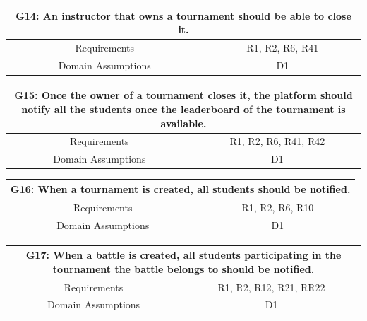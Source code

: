 \documentclass{article}
\begin{document}
\begin{table}[htbp]
    \centering
    \begin{tabular*}{\linewidth}{@{\extracolsep{\fill}} cc }
        \hline
        \multicolumn{2}{|c|}{\parbox{0.9\dimexpr\textwidth-2\tabcolsep\relax}{\centering\textbf{G14: An instructor that owns a tournament should be able to close it.}}} \\
        \hline
        Requirements & R1, R2, R6, R41\\
        \hline
        Domain Assumptions & D1\\
        \hline
    \end{tabular*}
\end{table}

\begin{table}[htbp]
    \centering
    \begin{tabular*}{\linewidth}{@{\extracolsep{\fill}} cc }
        \hline
        \multicolumn{2}{|c|}{\parbox{0.9\dimexpr\textwidth-2\tabcolsep\relax}{\centering\textbf{G15: Once the owner of a tournament closes it, the platform should notify all the students once the leaderboard of the tournament is available.}}} \\
        \hline
        Requirements & R1, R2, R6, R41, R42\\
        \hline
        Domain Assumptions & D1\\
        \hline
    \end{tabular*}
\end{table}

\begin{table}[htbp]
    \centering
    \begin{tabular*}{\linewidth}{@{\extracolsep{\fill}} cc }
        \hline
        \multicolumn{2}{|c|}{\parbox{0.9\dimexpr\textwidth-2\tabcolsep\relax}{\centering\textbf{G16: When a tournament is created, all students should be notified.}}} \\
        \hline
        Requirements & R1, R2, R6, R10\\
        \hline
        Domain Assumptions & D1\\
        \hline
    \end{tabular*}
\end{table}

\begin{table}[htbp]
    \centering
    \begin{tabular*}{\linewidth}{@{\extracolsep{\fill}} cc }
        \hline
        \multicolumn{2}{|c|}{\parbox{0.9\dimexpr\textwidth-2\tabcolsep\relax}{\centering\textbf{G17: When a battle is created, all students participating in the tournament the battle belongs to should be notified.}}} \\
        \hline
        Requirements & R1, R2, R12, R21, RR22\\
        \hline
        Domain Assumptions & D1\\
        \hline
    \end{tabular*}
\end{table}
\end{document}
